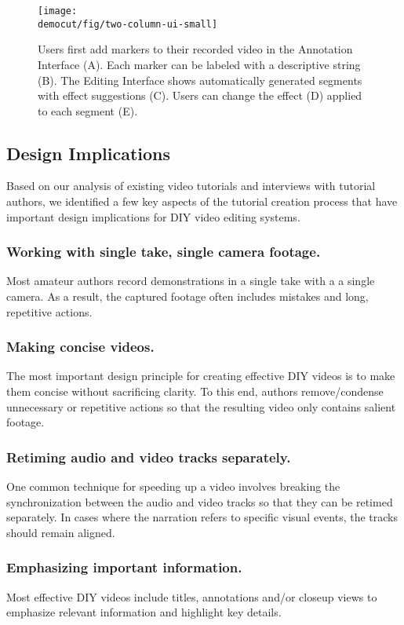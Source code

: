 \begin{figure*}[t]
  \centering
  \texttt{[image: \\democut/fig/two-column-ui-small]}
  \caption{Users first add markers to their recorded video in the Annotation Interface (A). Each marker can be labeled with a descriptive string (B). The Editing Interface shows automatically generated segments with effect suggestions (C). Users can change the effect (D) applied to each segment (E).}
  \label{fig:ui}
\end{figure*}


\subsection{Design Implications}

Based on our analysis of existing video tutorials and interviews with
tutorial authors, we identified a few key aspects of the tutorial creation
process that have important design implications for DIY video
editing systems.

\subsubsection{Working with single take, single camera footage.}
%
Most amateur authors record demonstrations in a single take with a
a single camera. As a result, the captured footage often includes
mistakes and long, repetitive actions.

\subsubsection{Making concise videos.}
%
The most important design principle for creating effective DIY videos
is to make them concise without sacrificing clarity. To this end,
authors remove/condense unnecessary or repetitive actions so that the
resulting video only contains salient footage.

\subsubsection{Retiming audio and video tracks separately.}
%
One common technique for speeding up a video involves breaking the
synchronization between the audio and video tracks so that they can be retimed
separately. In cases where the narration refers to
specific visual events, the tracks should remain aligned.

\subsubsection{Emphasizing important information.}
%
Most effective DIY videos include titles, annotations and/or closeup
views to emphasize relevant information and highlight key details.

